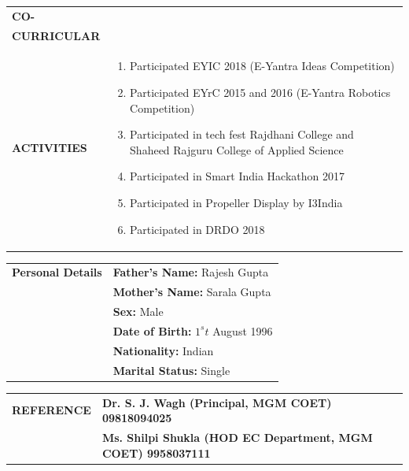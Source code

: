 \documentclass{article}
\begin{document}
\begin{table}[h]
    \begin{tabular}{l  p{}} 
      \textbf{\Large{CO-}} \\  \textbf{\Large{CURRICULAR}}\\ \textbf{\Large{ACTIVITIES}}&
	\begin{enumerate}
	\item Participated EYIC 2018 (E-Yantra Ideas Competition)
	\item Participated EYrC 2015 and 2016 (E-Yantra Robotics Competition)
	\item Participated in tech fest Rajdhani College and Shaheed Rajguru College of Applied Science
	\item Participated in Smart India Hackathon 2017
	\item Participated in Propeller Display by I3India
	\item Participated in DRDO 2018
   	\end{enumerate} 
    \end{tabular}
\end{table}

\begin{table}[h!]
    \begin{tabular}{l  l} 
      \textbf{\Large{Personal Details}} &
	\textbf{Father's Name: } Rajesh Gupta \\
	&\textbf{Mother's Name: } Sarala Gupta\\
	&\textbf{Sex: } Male\\
	&\textbf{Date of Birth: } $1^st$ August 1996\\
	&\textbf{Nationality: } Indian\\
	&\textbf{Marital Status: } Single\\
   	 
    \end{tabular}
\end{table}

\begin{table}[h!]
    \begin{tabular}{l  l} 
      \textbf{\Large{REFERENCE}} & 
   	 \textbf{Dr. S. J. Wagh (Principal, MGM COET) 09818094025} \\
	 &\textbf{Ms. Shilpi Shukla (HOD EC Department, MGM COET) 9958037111} \\
    \end{tabular}
\end{table}
\end{document}
